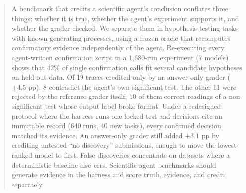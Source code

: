 \begin{abstract}
A benchmark that credits a scientific agent's conclusion conflates three
things: whether it is true, whether the agent's experiment supports it, and
whether the grader checked. We separate them in hypothesis-testing tasks with
known generating processes, using a frozen oracle that recomputes
confirmatory evidence independently of the agent. Re-executing every
agent-written confirmation script in a 1,680-run experiment (7 models) shows
that 42\% of single confirmation calls fit several candidate hypotheses on
held-out data. Of 19 traces credited only by an answer-only grader
($+4.5$ pp), 8 contradict the agent's own significant test. The other 11 were
rejected by the reference grader itself, 10 of them correct readings of a
non-significant test whose output label broke format. Under a redesigned
protocol where the harness runs one locked test and decisions cite an
immutable record (640 runs, 40 new tasks), every confirmed decision matched
its evidence. An answer-only grader still added $+3.1$ pp by crediting
untested ``no discovery'' submissions, enough to move the lowest-ranked model
to first. False discoveries concentrate on datasets where a deterministic
baseline also errs. Scientific-agent benchmarks should generate evidence in
the harness and score truth, evidence, and credit separately.
\end{abstract}
